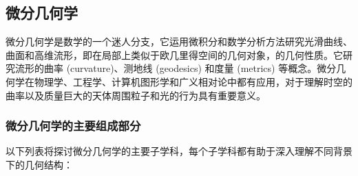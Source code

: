 
\begin{issues}
\issueAi
\end{issues}

\subsection{微分几何学}

微分几何学是数学的一个迷人分支，它运用微积分和数学分析方法研究光滑曲线、曲面和高维流形，即在局部上类似于欧几里得空间的几何对象，的几何性质。它研究流形的曲率 (curvature)、测地线 (geodesics) 和度量 (metrics) 等概念。微分几何学在物理学、工程学、计算机图形学和广义相对论中都有应用，对于理解时空的曲率以及质量巨大的天体周围粒子和光的行为具有重要意义。

\subsubsection{微分几何学的主要组成部分}

以下列表将探讨微分几何学的主要子学科，每个子学科都有助于深入理解不同背景下的几何结构：

